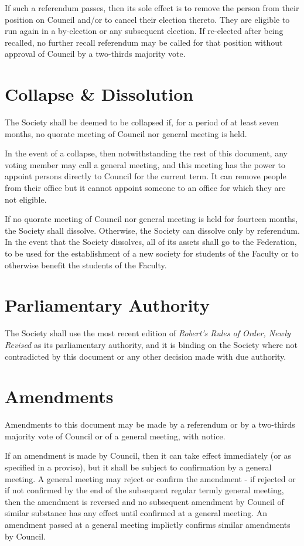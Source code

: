If such a referendum passes, then its sole effect is to remove the person from
their position on Council and/or to cancel their election thereto. They are
eligible to run again in a by-election or any subsequent election. If re-elected
after being recalled, no further recall referendum may be called for that
position without approval of Council by a two-thirds majority vote.

\section{Collapse \& Dissolution}
The Society shall be deemed to be collapsed if, for a period of at least seven
months, no quorate meeting of Council nor general meeting is held.

In the event of a collapse, then notwithstanding the rest of this document, any
voting member may call a general meeting, and this meeting has the power to
appoint persons directly to Council for the current term. It can remove people
from their office but it cannot appoint someone to an office for which they are
not eligible.

If no quorate meeting of Council nor general meeting is held for fourteen months, the
Society shall dissolve. Otherwise, the Society can dissolve only by referendum.
In the event that the Society dissolves, all of its assets shall go to the
Federation, to be used for the establishment of a new society for students of
the Faculty or to otherwise benefit the students of the Faculty.

\section{Parliamentary Authority}
The Society shall use the most recent edition of
\emph{Robert's Rules of Order, Newly Revised} as its parliamentary authority,
and it is binding on the Society where not contradicted by this document or any
other decision made with due authority.

\section{Amendments}
Amendments to this document may be made by a referendum or by a two-thirds
majority vote of Council or of a general meeting, with notice.

If an amendment is made by Council, then it can take effect immediately (or as
specified in a proviso), but it shall be subject to confirmation by a general
meeting. A general meeting may reject or confirm the amendment - if rejected
or if not confirmed by the end of the subsequent regular termly general meeting,
then the amendment is reversed and no subsequent amendment by Council of similar
substance has any effect until confirmed at a general meeting. An amendment
passed at a general meeting implictly confirms similar amendments by Council.

